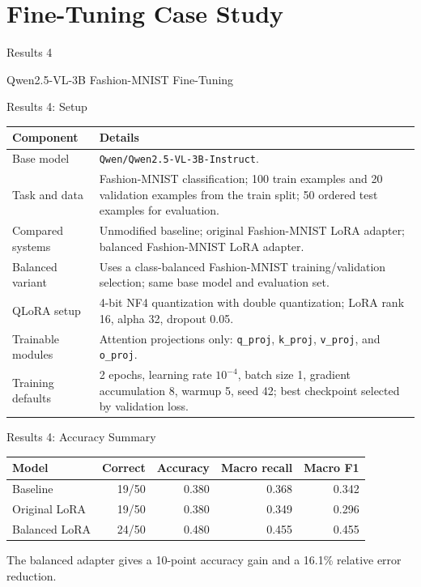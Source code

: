 \documentclass[aspectratio=169,11pt]{beamer}
\newcommand{\code}[1]{\texttt{#1}}
\newcommand{\sectiontitle}[2]{%
\begin{frame}
\vfill
\centering
{\usebeamerfont{title}\color{accent}#1\par}
\vspace{0.5cm}
{\large #2\par}
\vfill
\end{frame}
}
\begin{document}
\section{Fine-Tuning Case Study}
\sectiontitle{Results 4}{Qwen2.5-VL-3B Fashion-MNIST Fine-Tuning}

\begin{frame}{Results 4: Setup}
\scriptsize
\begin{tabularx}{\textwidth}{@{}p{2.7cm}X@{}}
\toprule
\textbf{Component} & \textbf{Details} \\
\midrule
Base model & \code{Qwen/Qwen2.5-VL-3B-Instruct}. \\
Task and data & Fashion-MNIST classification; 100 train examples and 20 validation examples from the train split; 50 ordered test examples for evaluation. \\
Compared systems & Unmodified baseline; original Fashion-MNIST LoRA adapter; balanced Fashion-MNIST LoRA adapter. \\
Balanced variant & Uses a class-balanced Fashion-MNIST training/validation selection; same base model and evaluation set. \\
QLoRA setup & 4-bit NF4 quantization with double quantization; LoRA rank 16, alpha 32, dropout 0.05. \\
Trainable modules & Attention projections only: \code{q\_proj}, \code{k\_proj}, \code{v\_proj}, and \code{o\_proj}. \\
Training defaults & 2 epochs, learning rate \(10^{-4}\), batch size 1, gradient accumulation 8, warmup 5, seed 42; best checkpoint selected by validation loss. \\
\bottomrule
\end{tabularx}
\end{frame}

\begin{frame}{Results 4: Accuracy Summary}
\small
\begin{tabularx}{\textwidth}{@{}lrrrr@{}}
\toprule
\textbf{Model} & \textbf{Correct} & \textbf{Accuracy} & \textbf{Macro recall} & \textbf{Macro F1} \\
\midrule
Baseline & 19/50 & 0.380 & 0.368 & 0.342 \\
Original LoRA & 19/50 & 0.380 & 0.349 & 0.296 \\
Balanced LoRA & 24/50 & 0.480 & 0.455 & 0.455 \\
\bottomrule
\end{tabularx}

\vspace{0.35cm}
The balanced adapter gives a 10-point accuracy gain and a 16.1\% relative
error reduction.
\end{frame}
\end{document}
